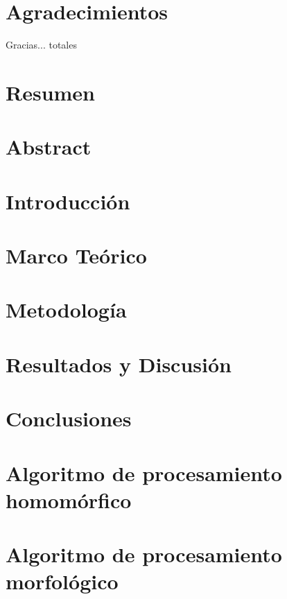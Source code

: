 \documentclass[11pt,a4paper]{report}
\begin{document}
\chapter*{Agradecimientos}
Gracias... totales
\chapter*{Resumen}  %

\chapter*{Abstract} %


\justifying
\setlength{\parindent}{20pt}
\chapter{Introducción}  
    
\chapter{Marco Teórico}
    
\chapter{Metodología}               \label{Metodología}
    
\chapter{Resultados y Discusión}    \label{Resultados}
    
\chapter{Conclusiones}      
    
\appendix
\chapter{Algoritmo de procesamiento homomórfico}
%


\chapter{Algoritmo de procesamiento morfológico} \label{script_morfo}
   
\end{document}
